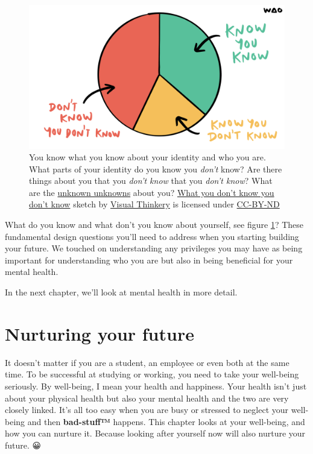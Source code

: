 \documentclass[
]{book}
\begin{document}
\begin{figure}

{\centering \includegraphics[width=1\linewidth]{images/you-dont-know-you-dont-know} 

}

\caption{You know what you know about your identity and who you are. What parts of your identity do you know you \emph{don't} know? Are there things about you that you \emph{don't know} that you \emph{don't know}? What are the \href{https://en.wikipedia.org/wiki/There_are_known_knowns}{unknown unknowns} about you? \href{https://bryanmmathers.com/what-you-dont-know-you-dont-know}{What you don't know you don't know} sketch by \href{https://visualthinkery.com/}{Visual Thinkery} is licensed under \href{https://creativecommons.org/licenses/by-nd/4.0/}{CC-BY-ND}}\label{fig:mathers-known-fig}
\end{figure}



What do you know and what don't you know about yourself, see figure \ref{fig:mathers-known-fig}? These fundamental design questions you'll need to address when you starting building your future. We touched on understanding any privileges you may have as being important for understanding who you are but also in being beneficial for your mental health.

In the next chapter, we'll look at mental health in more detail.

\hypertarget{nurturing}{%
\chapter{Nurturing your future}\label{nurturing}}

It doesn't matter if you are a student, an employee or even both at the same time. To be successful at studying or working, you need to take your well-being seriously. By well-being, I mean your health and happiness. Your health isn't just about your physical health but also your mental health and the two are very closely linked. It's all too easy when you are busy or stressed to neglect your well-being and then \textbf{bad-stuff™} happens. This chapter looks at your well-being, and how you can nurture it. Because looking after yourself now will also nurture your future. 😀
\end{document}
